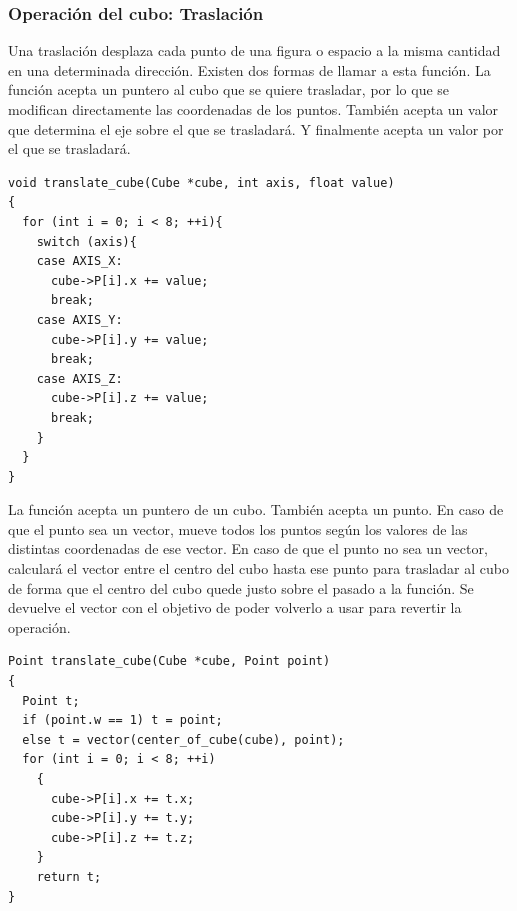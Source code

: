 \documentclass{article}
\begin{document}
\subsubsection{Operación del cubo: Traslación}
Una traslación desplaza cada punto de una figura o espacio a la misma cantidad en una determinada dirección. Existen dos formas de llamar a esta función. \newline
La función acepta un puntero al cubo que se quiere trasladar, por lo que se modifican directamente las coordenadas de los puntos. También acepta un valor que determina el eje sobre el que se trasladará. Y finalmente acepta un valor por el que se trasladará.
\begin{lstlisting}[frame=single]
void translate_cube(Cube *cube, int axis, float value)
{
  for (int i = 0; i < 8; ++i){
    switch (axis){
    case AXIS_X:
      cube->P[i].x += value;
      break;
    case AXIS_Y:
      cube->P[i].y += value;
      break;
    case AXIS_Z:
      cube->P[i].z += value;
      break;
    }
  }
}
\end{lstlisting}
La función acepta un puntero de un cubo. También acepta un punto. En caso de que el punto sea un vector, mueve todos los puntos según los valores de las distintas coordenadas de ese vector. En caso de que el punto no sea un vector, calculará el vector entre el centro del cubo hasta ese punto para trasladar al cubo de forma que el centro del cubo quede justo sobre el pasado a la función. Se devuelve el vector con el objetivo de poder volverlo a usar para revertir la operación.
\begin{lstlisting}[frame=single]
Point translate_cube(Cube *cube, Point point)
{
  Point t;
  if (point.w == 1) t = point;
  else t = vector(center_of_cube(cube), point);
  for (int i = 0; i < 8; ++i)
    {
      cube->P[i].x += t.x;
      cube->P[i].y += t.y;
      cube->P[i].z += t.z;
    }
    return t;
}
\end{lstlisting}

\end{document}
